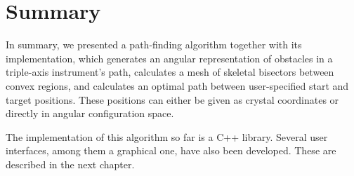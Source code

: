 \section{Summary}
In summary, we presented a path-finding algorithm together with its implementation, which generates an angular 
representation of obstacles in a triple-axis instrument's path, calculates a mesh of skeletal bisectors between 
convex regions, and calculates an optimal path between user-specified start and target positions. These positions
can either be given as crystal coordinates or directly in angular configuration space.

The implementation of this algorithm so far is a C++ library. Several user interfaces, among them a 
graphical one, have also been developed. These are described in the next chapter.

